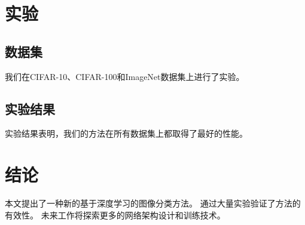 \documentclass[12pt]{article}
\begin{document}
\section{实验}

\subsection{数据集}

我们在CIFAR-10、CIFAR-100和ImageNet数据集上进行了实验。

\subsection{实验结果}

实验结果表明，我们的方法在所有数据集上都取得了最好的性能。

\section{结论}

本文提出了一种新的基于深度学习的图像分类方法。
通过大量实验验证了方法的有效性。
未来工作将探索更多的网络架构设计和训练技术。
\end{document}
